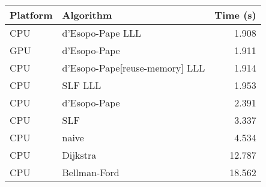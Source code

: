 \begin{tabular}{llr}
  \hline
  Platform & Algorithm & Time (s) \\
  \hline
  CPU & d'Esopo-Pape LLL & 1.908 \\
  GPU & d'Esopo-Pape & 1.911 \\
  CPU & d'Esopo-Pape[reuse-memory] LLL & 1.914 \\
  CPU & SLF LLL & 1.953 \\
  CPU & d'Esopo-Pape & 2.391 \\
  CPU & SLF & 3.337 \\
  CPU & naive & 4.534 \\
  CPU & Dijkstra & 12.787 \\
  CPU & Bellman-Ford & 18.562 \\
  \hline
\end{tabular}
